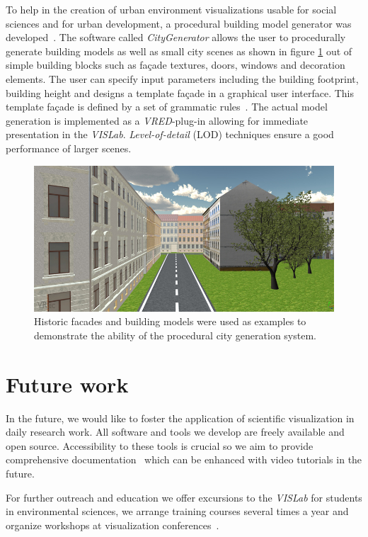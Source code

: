 \documentclass[twocolumn]{svjour3}          %
\begin{document}
To help in the creation of urban environment visualizations usable for social sciences and for urban development, a procedural\cite{procedural:modelling} building model generator was developed~\cite{bilke:master}. The software called \emph{CityGenerator} allows the user to procedurally generate building models as well as small city scenes as shown in figure \ref{fig:city} out of simple building blocks such as fa\c{c}ade textures, doors, windows and decoration elements. The user can specify input parameters including the building footprint, building height and designs a template fa\c{c}ade in a graphical user interface. This template fa\c{c}ade is defined by a set of grammatic rules~\cite{procedural:buildings}. The actual model generation is implemented as a \emph{VRED}-plug-in allowing for immediate presentation in the \emph{VISLab}. \emph{Level-of-detail} (LOD) techniques ensure a good performance of larger scenes.

\begin{figure}[htb]
  \includegraphics[width=\linewidth]{images/city.jpg}
\caption{Historic facades and building models were used as examples to demonstrate the ability of the procedural city generation system.}
\label{fig:city}
\end{figure}

\section{Future work}
\label{future-work}

In the future, we would like to foster the application of scientific visualization in daily research work. All software and tools we develop are freely available and open source. Accessibility to these tools is crucial so we aim to provide comprehensive documentation~\cite{web:ogs-docs} which can be enhanced with video tutorials in the future.

For further outreach and education we offer excursions to the \emph{VISLab} for students in environmental sciences, we arrange training courses several times a year and organize workshops at visualization conferences~\cite{web:envirvis}.
\end{document}
